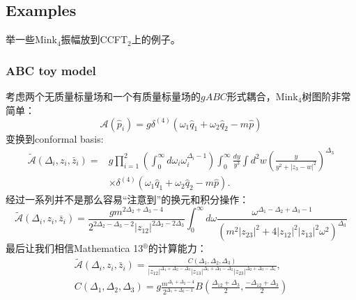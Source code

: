 \subsection{Examples}
举一些Mink$_4$振幅放到CCFT$_2$上的例子。
\subsubsection{ABC toy model}
考虑两个无质量标量场和一个有质量标量场的$gABC$形式耦合，Mink$_4$树图阶非常简单：
\begin{equation}
	\mathcal{A}(\hat{p}_i)=g\delta^{(4)}(\omega_1\hat{q}_1+\omega_2\hat{q}_2-m\hat{p})
\end{equation}
变换到conformal basis:
\begin{equation}
	\begin{aligned}
		\tilde{\mathcal{A}}(\Delta_{i},z_{i},\bar{z}_{i})=& g\prod_{i=1}^{2}\left(\int_{0}^{\infty}d\omega_{i}\omega_{i}^{\Delta_{i}-1}\right)\int_{0}^{\infty}\frac{dy}{y^{3}}\int d^{2}w\left(\frac{y}{y^{2}+|z_{3}-w|^{2}}\right)^{\Delta_{3}}  \\
		&\times\delta^{(4)}(\omega_{1}\hat{q}_{1}+\omega_{2}\hat{q}_{2}-m\hat{p}).
	\end{aligned}
\end{equation}
经过一系列并不是那么容易“注意到”的换元和积分操作\cite{Raclariu:2021zjz,Lam:2017ofc}：
\begin{equation}
	\widetilde{\mathcal{A}}(\Delta_i,z_i,\bar{z}_i)=\frac{gm^{2\Delta_2+\Delta_3-4}}{2^{2\Delta_2-\Delta_3-2}|z_{12}|^{2\Delta_2-2\Delta_3}}\int_0^\infty d\omega\frac{\omega^{\Delta_1-\Delta_2+\Delta_3-1}}{(m^2|z_{23}|^2+4|z_{12}|^2|z_{13}|^2\omega^2)^{\Delta_3}}
\end{equation}
最后让我们相信Mathematica 13$^\circledR$的计算能力：
\begin{equation}\label{48.132}
	\begin{gathered}
		\widetilde{\mathcal{A}}(\Delta_i,z_i,\bar{z}_i) =\frac{C(\Delta_1,\Delta_2,\Delta_3)}{|z_{12}|^{\Delta_1+\Delta_2-\Delta_3}|z_{13}|^{\Delta_1+\Delta_3-\Delta_2}|z_{23}|^{\Delta_2+\Delta_3-\Delta_1}}, \\
		C(\Delta_{1},\Delta_{2},\Delta_{3}) =g\frac{m^{\Delta_1+\Delta_2-4}}{2^{\Delta_1+\Delta_2-1}}B\left(\frac{\Delta_{12}+\Delta_3}2,\frac{-\Delta_{12}+\Delta_3}2\right)
	\end{gathered}
\end{equation}
